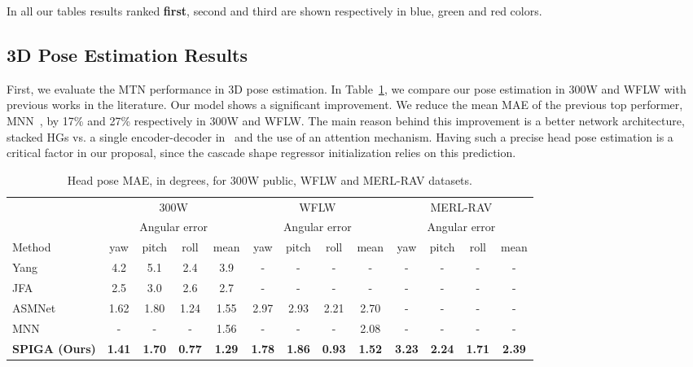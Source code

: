 \documentclass{bmvc2k}
\newcommand{\first}[1]{{\color{blue} \textbf{#1}}}
\newcommand{\second}[1]{{\color{green} #1}}
\newcommand{\third}[1]{{\color{red} #1}}
\begin{document}
In all our tables results ranked \first{first}, \second{second} and \third{third} are shown respectively in blue, green and red colors.


\subsection{3D Pose Estimation Results}

First, we evaluate the MTN performance in 3D pose estimation. In Table~\ref{tab:pose}, we compare our pose estimation in 300W and WFLW with previous works in the literature. Our model shows a significant improvement. We reduce the mean MAE of the previous top performer, MNN~\cite{Valle21}, by 17\% and 27\% respectively in 300W and WFLW. The main reason behind this improvement is a better network architecture, stacked HGs vs. a single encoder-decoder in~\cite{Valle21} and the use of an attention mechanism.
Having such a precise head pose estimation is a critical factor in our proposal, since the cascade shape regressor initialization relies on this prediction. 

\begin{table}
\footnotesize
\begin{center}
\setlength{\tabcolsep}{4pt} 
\begin{tabular}{l|ccc|c|ccc|c|ccc|c}
\hline
       & \multicolumn{4}{c}{300W}   & \multicolumn{4}{c}{WFLW} & \multicolumn{4}{c}{MERL-RAV} \\
       & \multicolumn{4}{c}{Angular error }   & \multicolumn{4}{c}{Angular error } & \multicolumn{4}{c}{Angular error } \\
Method & yaw & pitch & roll & mean  & yaw & pitch & roll & mean & yaw & pitch & roll & mean \\
\hline
Yang~\cite{Yang15}         & 4.2 & 5.1 & 2.4 & 3.9 & - & - & - & - & - & - & - & - \\
JFA~\cite{Xu17JFA}         & 2.5 & 3.0 & 2.6 & 2.7 & - & - & - & - & - & - & - & - \\
ASMNet~\cite{Fard21AMSNet} & 1.62  & 1.80 & 1.24 & 1.55 & 2.97  & 2.93 & 2.21 & 2.70 & - & - & - & - \\
MNN~\cite{Valle21}         &  -  & - &  - &  1.56 & - & - & - & 2.08 & - & - & - & - \\
\hline
\textbf{SPIGA (Ours)}      &  \first{1.41}  & \first{1.70} &  \first{0.77} &  \first{1.29}
                           & \first{1.78} & \first{1.86} & \first{0.93} & \first{1.52} 
                           & \first{3.23} & \first{2.24} & \first{1.71} & \first{2.39}\\
\hline
\end{tabular}
\end{center}
\caption{Head pose MAE, in degrees, for 300W public, WFLW and MERL-RAV datasets.}
\label{tab:pose}
\end{table}
\end{document}
